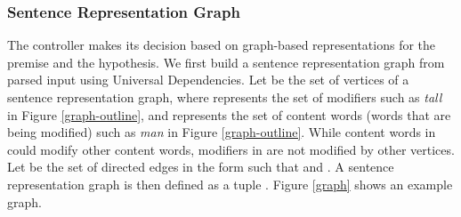 \documentclass[11pt,a4paper]{article}
\begin{document}
\subsubsection{Sentence Representation Graph}
The controller makes its decision based on  graph-based representations for the premise
and the hypothesis. We first build a sentence representation graph from
parsed input using Universal Dependencies. Let  be the set of vertices of a sentence representation graph, where  represents the set of modifiers such as \textit{tall} in Figure \ref{graph-outline}, and  represents the set of content words (words that are being modified) such as \textit{man} in Figure \ref{graph-outline}. While content words in  could modify other content words, modifiers in  are not modified by other vertices. Let  be the set of directed edges in the form  such that  and . A sentence representation graph is then defined as a tuple . Figure \ref{graph} shows an example graph.
\end{document}
